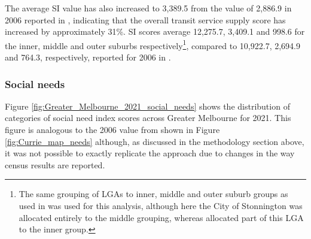 \documentclass[preprint, 3p,
authoryear]{elsarticle} %
\begin{document}
The average SI value has also increased to 3,389.5 from the value of
2,886.9 in 2006 reported in \citet{currie2010identifying}, indicating
that the overall transit service supply score has increased by
approximately 31\%. SI scores average 12,275.7, 3,409.1 and 998.6 for
the inner, middle and outer suburbs respectively\footnote{The same
  grouping of LGAs to inner, middle and outer suburb groups as used in
  \citet{currie2010identifying} was used for this analysis, although
  here the City of Stonnington was allocated entirely to the middle
  grouping, whereas \citet{currie2010identifying} allocated part of this
  LGA to the inner group.}, compared to 10,922.7, 2,694.9 and 764.3,
respectively, reported for 2006 in \citet{currie2010identifying}.

\subsubsection{Social needs}\label{social-needs}

Figure \ref{fig:Greater_Melbourne_2021_social_needs} shows the
distribution of categories of social need index scores across Greater
Melbourne for 2021. This figure is analogous to the 2006 value from
\citet{currie2010identifying} shown in Figure \ref{fig:Currie_map_needs}
although, as discussed in the methodology section above, it was not
possible to exactly replicate the \citet{currie2010identifying} approach
due to changes in the way census results are reported.
\end{document}

